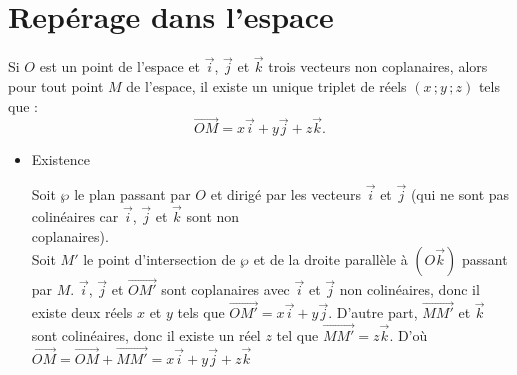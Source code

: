 \documentclass{cornouaille}
\begin{document}
\enlargethispage{1cm}


\section{Repérage dans l'espace}

\begin{theoreme}
  Si $O$ est un point de l'espace et $\overrightarrow{i}$,
  $ \overrightarrow{j}$ et $\overrightarrow{k}$ trois vecteurs non
  coplanaires, alors pour tout point $M$ de l'espace, il existe un
  unique triplet de réels $(x\,;y\,;z)$ tels que :
  \[
  \overrightarrow{OM}=x\overrightarrow{i}+y\overrightarrow{j}+z\overrightarrow{k}.
  \]
\end{theoreme}




\begin{preuve}
  \begin{itemize}
  \item Existence\\
    \begin{minipage}{.65\linewidth}
      Soit $\wp$ le plan passant par $O$ et dirigé par les vecteurs $\overrightarrow{i}$ et $ \overrightarrow{j}$ (qui ne sont pas colinéaires car $\overrightarrow{i}$, $ \overrightarrow{j}$ et $\overrightarrow{k}$ sont non\\ coplanaires).\\
      Soit $M'$ le point d'intersection de $\wp$ et de la droite
      parallèle à $(O\overrightarrow{k})$ passant par $M$.
      $\overrightarrow{i}$, $ \overrightarrow{j}$ et
      $\overrightarrow{OM'}$ sont coplanaires avec
      $\overrightarrow{i}$ et $ \overrightarrow{j}$ non colinéaires,
      donc il existe deux réels $x$ et $y$ tels que
      $ \overrightarrow{OM'}=x\overrightarrow{i}+y\overrightarrow{j}$.
      D'autre part, $\overrightarrow{MM'}$ et $\overrightarrow{k}$
      sont colinéaires, donc il existe un réel $z$ tel que
      $\overrightarrow{MM'}=z\overrightarrow{k}$.  D'où
      $
      \overrightarrow{OM}=\overrightarrow{OM}+\overrightarrow{MM'}=x\overrightarrow{i}+y\overrightarrow{j}+z\overrightarrow{k}$
    \end{minipage}
    \begin{minipage}{.35\linewidth}

\end{minipage}
\end{itemize}
\end{preuve}
\end{document}
